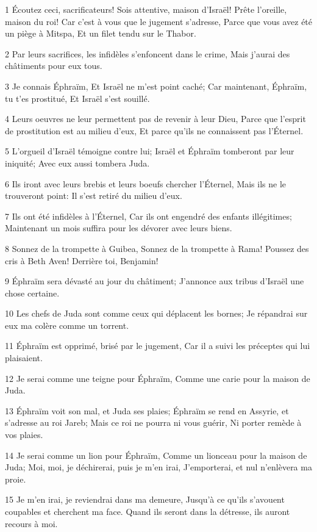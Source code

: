 \par 1 Écoutez ceci, sacrificateurs! Sois attentive, maison d'Israël! Prête l'oreille, maison du roi! Car c'est à vous que le jugement s'adresse, Parce que vous avez été un piège à Mitspa, Et un filet tendu sur le Thabor.
\par 2 Par leurs sacrifices, les infidèles s'enfoncent dans le crime, Mais j'aurai des châtiments pour eux tous.
\par 3 Je connais Éphraïm, Et Israël ne m'est point caché; Car maintenant, Éphraïm, tu t'es prostitué, Et Israël s'est souillé.
\par 4 Leurs oeuvres ne leur permettent pas de revenir à leur Dieu, Parce que l'esprit de prostitution est au milieu d'eux, Et parce qu'ils ne connaissent pas l'Éternel.
\par 5 L'orgueil d'Israël témoigne contre lui; Israël et Éphraïm tomberont par leur iniquité; Avec eux aussi tombera Juda.
\par 6 Ils iront avec leurs brebis et leurs boeufs chercher l'Éternel, Mais ils ne le trouveront point: Il s'est retiré du milieu d'eux.
\par 7 Ils ont été infidèles à l'Éternel, Car ils ont engendré des enfants illégitimes; Maintenant un mois suffira pour les dévorer avec leurs biens.
\par 8 Sonnez de la trompette à Guibea, Sonnez de la trompette à Rama! Poussez des cris à Beth Aven! Derrière toi, Benjamin!
\par 9 Éphraïm sera dévasté au jour du châtiment; J'annonce aux tribus d'Israël une chose certaine.
\par 10 Les chefs de Juda sont comme ceux qui déplacent les bornes; Je répandrai sur eux ma colère comme un torrent.
\par 11 Éphraïm est opprimé, brisé par le jugement, Car il a suivi les préceptes qui lui plaisaient.
\par 12 Je serai comme une teigne pour Éphraïm, Comme une carie pour la maison de Juda.
\par 13 Éphraïm voit son mal, et Juda ses plaies; Éphraïm se rend en Assyrie, et s'adresse au roi Jareb; Mais ce roi ne pourra ni vous guérir, Ni porter remède à vos plaies.
\par 14 Je serai comme un lion pour Éphraïm, Comme un lionceau pour la maison de Juda; Moi, moi, je déchirerai, puis je m'en irai, J'emporterai, et nul n'enlèvera ma proie.
\par 15 Je m'en irai, je reviendrai dans ma demeure, Jusqu'à ce qu'ils s'avouent coupables et cherchent ma face. Quand ils seront dans la détresse, ils auront recours à moi.

